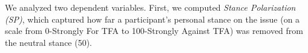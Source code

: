 
We analyzed two dependent variables.  First, we computed {\it Stance Polarization (SP)}, which captured how far a participant's personal stance on the issue (on a scale from 0-Strongly For TFA to 100-Strongly Against TFA) was removed from the neutral stance (50).%


